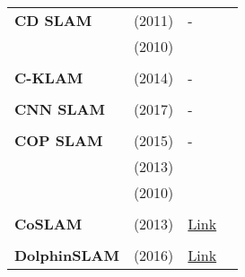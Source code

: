 \documentclass[a4paper,12pt]{scrartcl}
\begin{document}
{\begin{longtable}{l|l|l|l}
    \textbf{CD SLAM}       & \cite{Pirker2011} (2011)          & -                                                                  &                       \\
                           & \cite{Pirker2010} (2010)          &                                                                    &                       \\
                           &                                   &                                                                    &                       \\
    \textbf{C-KLAM}        & \cite{Nerurkar2014} (2014)        & -                                                                  &                       \\
                           &                                   &                                                                    &                       \\
    \textbf{CNN SLAM}      & \cite{Tateno2017} (2017)          & -                                                                  &                       \\
                           &                                   &                                                                    &                       \\
    \textbf{COP SLAM}      & \cite{Dubbelman2015} (2015)       & -                                                                  &                       \\
                           & \cite{Dubbelman2013} (2013)       &                                                                    &                       \\
                           & \cite{Dubbelman2010} (2010)       &                                                                    &                       \\
                           &                                   &                                                                    &                       \\
    \textbf{CoSLAM}        & \cite{Zou2013} (2013)             & {\href{https://github.com/danping/CoSLAM}{Link}}                   &                       \\
                           &                                   &                                                                    &                       \\
    \textbf{DolphinSLAM}   & \cite{Zaffari2016} (2016)         & {\href{https://github.com/dolphin-slam}{Link}}                     &                       \\

\end{longtable}}
\end{document}
